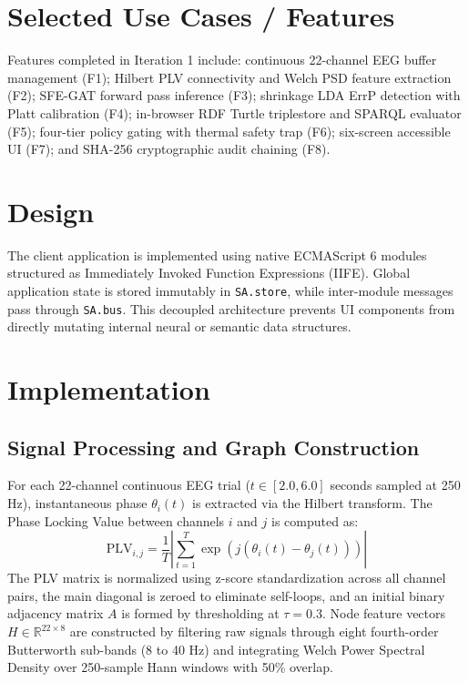 \documentclass[12pt,a4paper]{report}
\begin{document}
\section{Selected Use Cases / Features}
Features completed in Iteration 1 include: continuous 22-channel EEG buffer management (F1); Hilbert PLV connectivity and Welch PSD feature extraction (F2); SFE-GAT forward pass inference (F3); shrinkage LDA ErrP detection with Platt calibration (F4); in-browser RDF Turtle triplestore and SPARQL evaluator (F5); four-tier policy gating with thermal safety trap (F6); six-screen accessible UI (F7); and SHA-256 cryptographic audit chaining (F8).

\section{Design}
The client application is implemented using native ECMAScript 6 modules structured as Immediately Invoked Function Expressions (IIFE). Global application state is stored immutably in \texttt{SA.store}, while inter-module messages pass through \texttt{SA.bus}. This decoupled architecture prevents UI components from directly mutating internal neural or semantic data structures.

\section{Implementation}
\subsection{Signal Processing and Graph Construction}
For each 22-channel continuous EEG trial ($t \in [2.0, 6.0]$ seconds sampled at 250 Hz), instantaneous phase $\theta_i(t)$ is extracted via the Hilbert transform. The Phase Locking Value between channels $i$ and $j$ is computed as:
\begin{equation}
    \mathrm{PLV}_{i,j} = \frac{1}{T} \left| \sum_{t=1}^T \exp\left(j \left(\theta_i(t) - \theta_j(t)\right)\right) \right|
\end{equation}
The PLV matrix is normalized using z-score standardization across all channel pairs, the main diagonal is zeroed to eliminate self-loops, and an initial binary adjacency matrix $A$ is formed by thresholding at $\tau = 0.3$. Node feature vectors $H \in \mathbb{R}^{22 \times 8}$ are constructed by filtering raw signals through eight fourth-order Butterworth sub-bands (8 to 40 Hz) and integrating Welch Power Spectral Density over 250-sample Hann windows with 50\% overlap.
\end{document}

